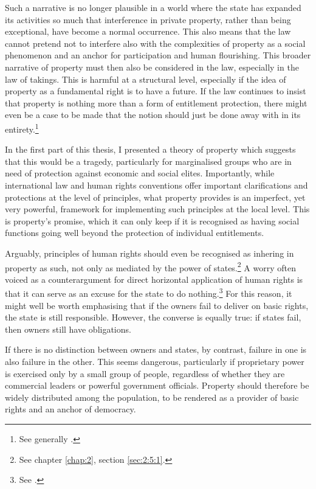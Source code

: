 {{Such a narrative is no longer plausible in a world where the state has expanded its activities so much that interference in private property, rather than being exceptional, have become a normal occurrence. This also means that the law cannot pretend not to interfere also with the complexities of property as a social phenomenon and an anchor for participation and human flourishing. This broader narrative of property must then also be considered in the law, especially in the law of takings.}
This is harmful at a structural level, especially if the idea of property as a fundamental right is to have a future. If the law continues to insist that property is nothing more than a form of entitlement protection, there might even be a case to be made that the notion should just be done away with in its entirety.\footnote{See generally \cite{grey80}.}

In the first part of this thesis, I presented a theory of property which suggests that this would be a tragedy, particularly for marginalised groups who are in need of protection against economic and social elites. Importantly, while international law and human rights conventions offer important clarifications and protections at the level of principles, what property provides is an imperfect, yet very powerful, framework for implementing such principles at the local level. This is property's promise, which it can only keep if it is recognised as having social functions going well beyond the protection of individual entitlements.

Arguably, principles of human rights should even be recognised as inhering in property as such, not only as mediated by the power of states.\footnote{See chapter \ref{chap:2}, section \ref{sec:2:5:1}.} A worry often voiced as a counterargument for direct horizontal application of human rights is that it can serve as an excuse for the state to do nothing.\footnote{See \cite[110]{manisuli07}.} For this reason, it might well be worth emphasising that if the owners fail to deliver on basic rights, the state is still responsible. However, the converse is equally true: if states fail, then owners still have obligations.

If there is no distinction between owners and states, by contrast, failure in one is also failure in the other. This seems dangerous, particularly if proprietary power is exercised only by a small group of people, regardless of whether they are commercial leaders or powerful government officials. Property should therefore be widely distributed among the population, to be rendered as a provider of basic rights and an anchor of democracy.

}
